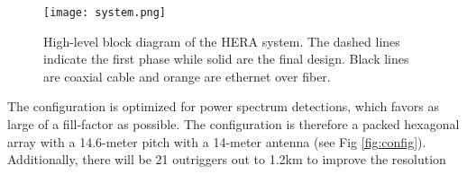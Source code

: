 \documentclass{article}
\begin{document}
\begin{figure}[t]
\centerline{
\texttt{[image: system.png]} }
\caption{\small High-level block diagram of the HERA system.  The dashed lines indicate the first phase while solid are the final design.  Black lines are coaxial cable and orange are ethernet over fiber.
\label{fig:system}}
\end{figure}

The configuration is optimized for power spectrum detections, which favors as large of a fill-factor as possible.  The configuration is therefore a packed hexagonal array with a 14.6-meter pitch with a 14-meter antenna (see Fig \ref{fig:config}).  Additionally, there will be 21 outriggers out to 1.2km to improve the resolution 

\end{document}
